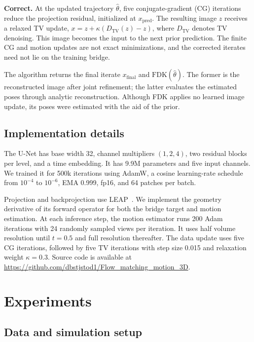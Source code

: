 \documentclass[11pt]{article}
\newcommand{\FDK}{\mathrm{FDK}}
\newcommand{\thetahat}{\hat\theta}
\begin{document}
\textbf{Correct.} At the updated trajectory $\thetahat$, five conjugate-gradient
(CG) iterations reduce the projection residual, initialized at $x_{\mathrm{pred}}$.
The resulting image $z$ receives a relaxed TV update,
$x=z+\kappa(D_{\mathrm{TV}}(z)-z)$, where $D_{\mathrm{TV}}$ denotes TV denoising.
This image becomes the input to the next prior prediction. The finite CG and motion
updates are not exact minimizations, and the corrected iterates need not lie on the
training bridge.

The algorithm returns the final iterate $x_{\mathrm{final}}$ and
$\FDK(\thetahat)$. The former is the reconstructed image after joint refinement;
the latter evaluates the estimated poses through analytic reconstruction. Although
FDK applies no learned image update, its poses were estimated with the aid of the prior.

\subsection{Implementation details}
\label{sec:impl}

The U-Net has base width 32, channel multipliers $(1,2,4)$, two residual blocks per
level, and a time embedding. It has 9.9M parameters and five input channels. We trained
it for 500k iterations using AdamW, a cosine learning-rate schedule from $10^{-4}$ to
$10^{-6}$, EMA 0.999, fp16, and 64 patches per batch.

Projection and backprojection use LEAP~\cite{leap23}. We implement the geometry
derivative of its forward operator for both the bridge target and motion estimation.
At each inference step, the motion estimator runs 200 Adam iterations with 24 randomly
sampled views per iteration. It uses half volume resolution until $t=0.5$ and full
resolution thereafter. The data update uses five CG iterations, followed by five TV
iterations with step size 0.015 and relaxation weight $\kappa=0.3$.
Source code is available at \url{https://github.com/dbstjstod1/Flow_matching_motion_3D}.

\section{Experiments}
\label{sec:setup}

\subsection{Data and simulation setup}
\label{sec:data}
\end{document}
